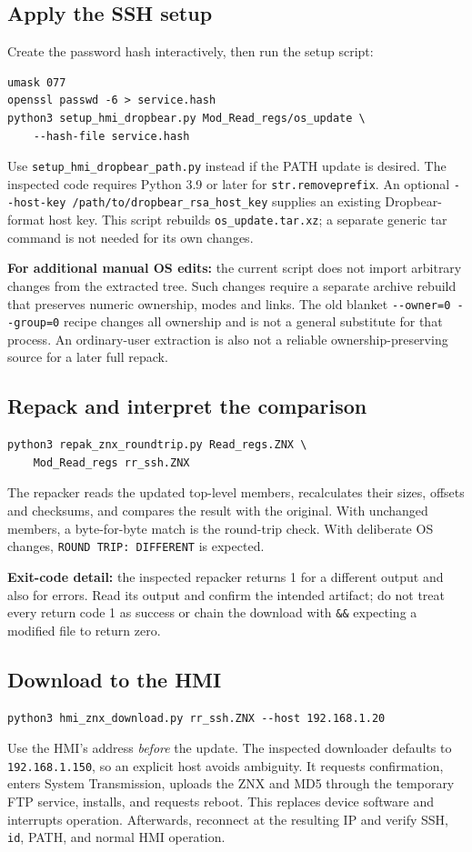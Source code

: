 \documentclass[10pt,letterpaper]{article}
\newcommand{\file}[1]{\nolinkurl{#1}}
\begin{document}
\subsection{Apply the SSH setup}
Create the password hash interactively, then run the setup script:
\begin{lstlisting}
umask 077
openssl passwd -6 > service.hash
python3 setup_hmi_dropbear.py Mod_Read_regs/os_update \
    --hash-file service.hash
\end{lstlisting}
Use \file{setup_hmi_dropbear_path.py} instead if the PATH update is desired.
The inspected code requires Python 3.9 or later for \file{str.removeprefix}.
An optional \file{--host-key /path/to/dropbear_rsa_host_key} supplies an existing
Dropbear-format host key. This script rebuilds \file{os_update.tar.xz}; a
separate generic tar command is not needed for its own changes.

\textbf{For additional manual OS edits:} the current script does not import
arbitrary changes from the extracted tree. Such changes require a separate
archive rebuild that preserves numeric ownership, modes and links. The old
blanket \file{--owner=0 --group=0} recipe changes all ownership and is not a
general substitute for that process. An ordinary-user extraction is also not
a reliable ownership-preserving source for a later full repack.

\subsection{Repack and interpret the comparison}
\begin{lstlisting}
python3 repak_znx_roundtrip.py Read_regs.ZNX \
    Mod_Read_regs rr_ssh.ZNX
\end{lstlisting}
The repacker reads the updated top-level members, recalculates their sizes,
offsets and checksums, and compares the result with the original. With unchanged
members, a byte-for-byte match is the round-trip check. With deliberate OS
changes, \file{ROUND TRIP: DIFFERENT} is expected.

\textbf{Exit-code detail:} the inspected repacker returns 1 for a different
output and also for errors. Read its output and confirm the intended artifact;
do not treat every return code 1 as success or chain the download with
\file{&&} expecting a modified file to return zero.

\subsection{Download to the HMI}
\begin{lstlisting}
python3 hmi_znx_download.py rr_ssh.ZNX --host 192.168.1.20
\end{lstlisting}
Use the HMI's address \emph{before} the update. The inspected downloader defaults
to \file{192.168.1.150}, so an explicit host avoids ambiguity. It requests
confirmation, enters System Transmission, uploads the ZNX and MD5 through the
temporary FTP service, installs, and requests reboot. This replaces device
software and interrupts operation. Afterwards, reconnect at the resulting IP
and verify SSH, \file{id}, PATH, and normal HMI operation.
\end{document}
